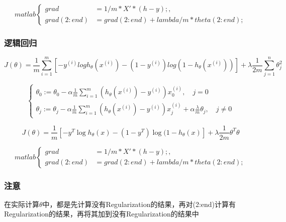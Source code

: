 \[matlab\begin{cases}
	grad &= 1/m * X'*(h-y); , \quad\\
	grad(2:end) &= grad(2:end) + lambda/m * theta(2:end);
\end{cases}\]



\subsubsection{逻辑回归}

\begin{equation}
	J(\theta) = \frac{1}{m}
	    \sum_{i=1}^m \left[ -y^{(i)}log{h_\theta(x^{(i)})} - (1-y^{(i)})log{(1-h_\theta(x^{(i)}))} \right]
		+ \lambda \frac{1}{2m} \sum_{j=1}^n\theta_j^2
\end{equation}

\[\begin{cases}
	\theta_0 := \theta_0 - \alpha \frac{1}{m} \sum_{i=1}^m(h_\theta(x^{(i)}) - y^{(i)})x_0^{(i)}, \quad j=0 \\
	\theta_j := \theta_j - \alpha \frac{1}{m} \sum_{i=1}^m(h_\theta(x^{(i)}) - y^{(i)})x_j^{(i)} + \alpha\frac{\lambda}{m}\theta_j, \quad j \neq 0
\end{cases}\]

\begin{equation}
		J(\theta) = \frac{1}{m} \left[-y^T \log{h_\theta(x)} - (1-y^T) \log{(1-h_\theta(x)}\right] + \lambda \frac{1}{2m}\theta^T \theta
\end{equation}


\[matlab\begin{cases}
	grad &= 1/m * X'*(h-y); , \quad\\
	grad(2:end) &= grad(2:end) + lambda/m * theta(2:end);
\end{cases}\]



\subsubsection{注意}
在实际计算$\theta$中，都是先计算没有Regularization的结果，再对(2:end)计算有Regularization的结果，再将其加到没有Regularization的结果中






